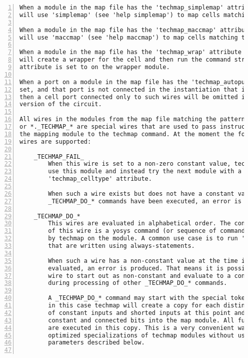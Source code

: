 \begin{lstlisting}[numbers=left,frame=single]
When a module in the map file has the 'techmap_simplemap' attribute set, techmap
will use 'simplemap' (see 'help simplemap') to map cells matching the module.

When a module in the map file has the 'techmap_maccmap' attribute set, techmap
will use 'maccmap' (see 'help maccmap') to map cells matching the module.

When a module in the map file has the 'techmap_wrap' attribute set, techmap
will create a wrapper for the cell and then run the command string that the
attribute is set to on the wrapper module.

When a port on a module in the map file has the 'techmap_autopurge' attribute
set, and that port is not connected in the instantiation that is mapped, then
then a cell port connected only to such wires will be omitted in the mapped
version of the circuit.

All wires in the modules from the map file matching the pattern _TECHMAP_*
or *._TECHMAP_* are special wires that are used to pass instructions from
the mapping module to the techmap command. At the moment the following special
wires are supported:

    _TECHMAP_FAIL_
        When this wire is set to a non-zero constant value, techmap will not
        use this module and instead try the next module with a matching
        'techmap_celltype' attribute.

        When such a wire exists but does not have a constant value after all
        _TECHMAP_DO_* commands have been executed, an error is generated.

    _TECHMAP_DO_*
        This wires are evaluated in alphabetical order. The constant text value
        of this wire is a yosys command (or sequence of commands) that is run
        by techmap on the module. A common use case is to run 'proc' on modules
        that are written using always-statements.

        When such a wire has a non-constant value at the time it is to be
        evaluated, an error is produced. That means it is possible for such a
        wire to start out as non-constant and evaluate to a constant value
        during processing of other _TECHMAP_DO_* commands.

        A _TECHMAP_DO_* command may start with the special token 'CONSTMAP; '.
        in this case techmap will create a copy for each distinct configuration
        of constant inputs and shorted inputs at this point and import the
        constant and connected bits into the map module. All further commands
        are executed in this copy. This is a very convenient way of creating
        optimized specializations of techmap modules without using the special
        parameters described below.


\end{lstlisting}
